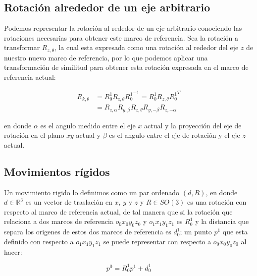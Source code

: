 \begin{multicols*}{2}

        \subsection{Rotación alrededor de un eje arbitrario}

            Podemos representar la rotación al rededor de un eje arbitrario conociendo las rotaciones necesarias para obtener este marco de referencia. Sea la rotación a transformar $R_{z, \theta}$, la cual esta expresada como una rotación al rededor del eje $z$ de nuestro nuevo marco de referencia, por lo que podemos aplicar una transformación de similitud para obtener esta rotación expresada en el marco de referencia actual:

            \begin{align}
                R_{k, \theta} &= R_0^1 R_{z, \theta} {R_0^1}^{-1} = R_0^1 R_{z, \theta} {R_0^1}^{T} \nonumber \\
                &= R_{z, \alpha} R_{y, \beta} R_{z, \theta} R_{y, -\beta} R_{z, -\alpha}
            \end{align}

            en donde $\alpha$ es el angulo medido entre el eje $x$ actual y la proyección del eje de rotación en el plano $xy$ actual y $\beta$ es el angulo entre el eje de rotación y el eje $z$ actual.


        \subsection{Movimientos rígidos}

            Un movimiento rigido lo definimos como un par ordenado $(d, R)$, en donde $d \in \mathbb{R}^3$ es un vector de traslación en $x$, $y$ y $z$ y $R \in SO(3)$ es una rotación con respecto al marco de referencia actual, de tal manera que si la rotación que relaciona a dos marcos de referencia $o_0 x_0 y_0 z_0$ y $o_1 x_1 y_1 z_1$ es $R_0^1$ y la distancia que separa los origenes de estos dos marcos de referencia es $d_0^1$; un punto $p^1$ que esta definido con respecto a $o_1 x_1 y_1 z_1$ se puede representar con respecto a $o_0 x_0 y_0 z_0$ al hacer:

            \begin{equation}
                p^0 = R_0^1 p^1 + d_0^1
            \end{equation}


\end{multicols*}
